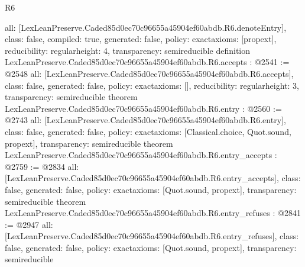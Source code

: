 \begin{lexlean}{R6}
\begin{coremodule}
{  all: [LexLeanPreserve.Caded85d0ec70c96655a45904ef60abdb.R6.denoteEntry],
  class: false,
  compiled: true,
  generated: false,
  policy: exact{axioms: [propext]},
  reducibility: regular{height: 4},
  transparency: semireducible
}
definition LexLeanPreserve.Caded85d0ec70c96655a45904ef60abdb.R6.accepts : @2541 := @2548 {
  all: [LexLeanPreserve.Caded85d0ec70c96655a45904ef60abdb.R6.accepts],
  class: false,
  generated: false,
  policy: exact{axioms: []},
  reducibility: regular{height: 3},
  transparency: semireducible
}
theorem LexLeanPreserve.Caded85d0ec70c96655a45904ef60abdb.R6.entry : @2560 := @2743 {
  all: [LexLeanPreserve.Caded85d0ec70c96655a45904ef60abdb.R6.entry],
  class: false,
  generated: false,
  policy: exact{axioms: [Classical.choice, Quot.sound, propext]},
  transparency: semireducible
}
theorem LexLeanPreserve.Caded85d0ec70c96655a45904ef60abdb.R6.entry_accepts : @2759 := @2834 {
  all: [LexLeanPreserve.Caded85d0ec70c96655a45904ef60abdb.R6.entry_accepts],
  class: false,
  generated: false,
  policy: exact{axioms: [Quot.sound, propext]},
  transparency: semireducible
}
theorem LexLeanPreserve.Caded85d0ec70c96655a45904ef60abdb.R6.entry_refuses : @2841 := @2947 {
  all: [LexLeanPreserve.Caded85d0ec70c96655a45904ef60abdb.R6.entry_refuses],
  class: false,
  generated: false,
  policy: exact{axioms: [Quot.sound, propext]},
  transparency: semireducible
}


\end{coremodule}
\end{lexlean}
